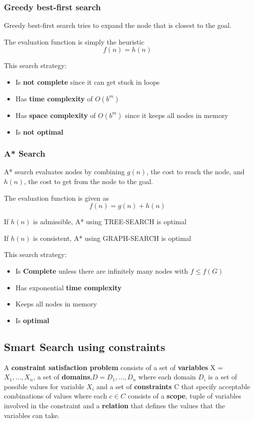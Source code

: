 \documentclass{article}
\begin{document}
\subsubsection{Greedy best-first search}

Greedy best-first search tries to expand the node that is closest to the goal.

The evaluation function is simply the heuristic $$f(n) = h(n)$$

This search strategy:
\begin{itemize}
    \item Is \textbf{not complete} since it can get stuck in loops
    \item Has \textbf{time complexity} of $O(b^m)$ 
    \item Has \textbf{space complexity} of $O(b^m)$ since it keeps all nodes in memory
    \item Is \textbf{not optimal}
\end{itemize}

\subsubsection{A* Search}

A* search evaluates nodes by combining $g(n)$, the cost to reach the node, and $h(n)$, the cost to get from the node to the goal.

The evaluation function is given as $$f(n) = g(n) + h(n)$$

If $h(n)$ is admissible, A* using TREE-SEARCH is optimal

If $h(n)$ is consistent, A* using GRAPH-SEARCH is optimal \newline

This search strategy:
\begin{itemize}
    \item Is \textbf{Complete} unless there are infinitely many nodes with $f \leq f(G)$
    \item Has exponential \textbf{time complexity}
    \item Keeps all nodes in memory
    \item Is \textbf{optimal}
\end{itemize}

\subsection{Smart Search using constraints}

A \textbf{constraint satisfaction problem} consists of a set of \textbf{variables} X = ${X_1,\ldots,X_n}$, a set of \textbf{domains},$D = {D_1,\ldots,D_n}$ where each domain $D_i$ is a set of possible values for variable $X_i$ and a set of \textbf{constraints} C that specify acceptable combinations of values where each $c \in C$ consists of a \textbf{scope}, tuple of variables involved in the constraint and a \textbf{relation} that defines the values that the variables can take.
\end{document}
